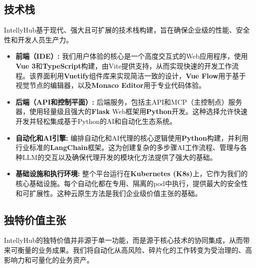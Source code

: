 \documentclass[11pt, a4paper, oneside]{article}
\begin{document}
\pagebreak
\subsection{技术栈}
IntellyHub基于现代、强大且可扩展的技术栈构建，旨在确保企业级的性能、安全性和开发人员生产力。

\begin{itemize}
\item \textbf{前端（IDE）:} 我们用户体验的核心是一个高度交互式的Web应用程序，使用\textbf{Vue 3}和\textbf{TypeScript}构建，由Vite提供支持，从而实现快速的开发工作流程。该界面利用\textbf{Vuetify}组件库来实现简洁一致的设计，\textbf{Vue Flow}用于基于视觉节点的编辑器，以及\textbf{Monaco Editor}用于专业代码体验。

\item \textbf{后端（API和控制平面）:} 后端服务，包括主API和MCP（主控制点）服务器，使用轻量级且强大的\textbf{Flask} Web框架用\textbf{Python}开发。这种选择允许快速开发并轻松集成基于Python的AI和自动化生态系统。

\item \textbf{自动化和AI引擎:} 编排自动化和AI代理的核心逻辑使用\textbf{Python}构建，并利用行业标准的\textbf{LangChain}框架。这为创建复杂的多步骤AI工作流程、管理与各种LLM的交互以及确保代理开发的模块化方法提供了强大的基础。

\item \textbf{基础设施和执行环境:} 整个平台运行在\textbf{Kubernetes (K8s)}上，它作为我们的核心基础设施。每个自动化都在专用、隔离的pod中执行，提供最大的安全性和可扩展性。这种云原生方法是我们企业级价值主张的基础。
\end{itemize}

\subsection{独特价值主张}
IntellyHub的独特价值并非源于单一功能，而是源于核心技术的协同集成，从而带来可衡量的业务成果。我们将自动化从高风险、碎片化的工作转变为受治理的、高影响力和可量化的业务资产。
\end{document}
